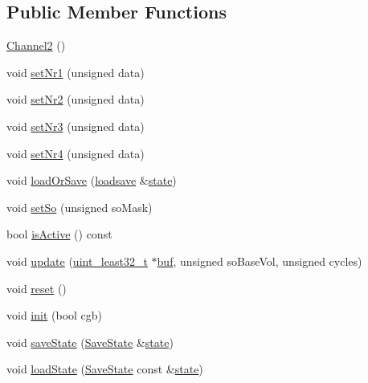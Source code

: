 \subsection*{Public Member Functions}
\begin{DoxyCompactItemize}
\item 
\hyperlink{classgambatte_1_1Channel2_a9439edf10073a5eac15556cd503d0182}{Channel2} ()
\item 
void \hyperlink{classgambatte_1_1Channel2_a77f0fdaa9b46038ece53181518bdb2cf}{set\+Nr1} (unsigned data)
\item 
void \hyperlink{classgambatte_1_1Channel2_a510e5b62ec5f2b64396aacb554bcfe99}{set\+Nr2} (unsigned data)
\item 
void \hyperlink{classgambatte_1_1Channel2_a1ef8b568dcd73da7dfbfe141098827fe}{set\+Nr3} (unsigned data)
\item 
void \hyperlink{classgambatte_1_1Channel2_a56454c49f4fed868967b30f6779e78da}{set\+Nr4} (unsigned data)
\item 
void \hyperlink{classgambatte_1_1Channel2_a49323ba3b0f4c200538c785fdce2d371}{load\+Or\+Save} (\hyperlink{classgambatte_1_1loadsave}{loadsave} \&\hyperlink{ppu_8cpp_a2f2eca6997ee7baf8901725ae074d45b}{state})
\item 
void \hyperlink{classgambatte_1_1Channel2_a63d7445c20fc635f6bbc28b51c17c690}{set\+So} (unsigned so\+Mask)
\item 
bool \hyperlink{classgambatte_1_1Channel2_a866214a53810c25c810ca09855aa4e7c}{is\+Active} () const
\item 
void \hyperlink{classgambatte_1_1Channel2_a017f34d58c36f89f8b3f64a552e3b31e}{update} (\hyperlink{namespacegambatte_a0639f09fccfbbd5a8e0796318768e370}{uint\+\_\+least32\+\_\+t} $\ast$\hyperlink{ioapi_8h_a8ad8a13c88886b9f623034ff88570adb}{buf}, unsigned so\+Base\+Vol, unsigned cycles)
\item 
void \hyperlink{classgambatte_1_1Channel2_a41bfbf50f1d123c43d5b5317ec73387a}{reset} ()
\item 
void \hyperlink{classgambatte_1_1Channel2_a10af65cdd99207c851a00ce7b15245ab}{init} (bool cgb)
\item 
void \hyperlink{classgambatte_1_1Channel2_a65e1566e37749fa686bf5f607fc10161}{save\+State} (\hyperlink{structgambatte_1_1SaveState}{Save\+State} \&\hyperlink{ppu_8cpp_a2f2eca6997ee7baf8901725ae074d45b}{state})
\item 
void \hyperlink{classgambatte_1_1Channel2_a22a07432a95ad31fdec2f9e7b1ef6f97}{load\+State} (\hyperlink{structgambatte_1_1SaveState}{Save\+State} const \&\hyperlink{ppu_8cpp_a2f2eca6997ee7baf8901725ae074d45b}{state})
\end{DoxyCompactItemize}
